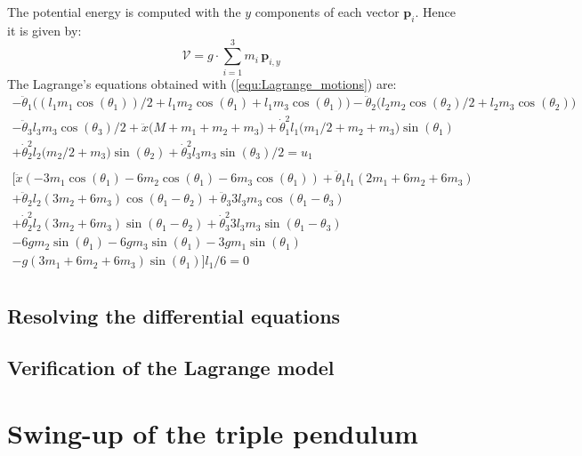 \documentclass[a4paper,12pt,twoside]{article}
\begin{document}
The potential energy is computed with the $y$ components of each vector $\mathbf{p}_i$. Hence it is given by:
\begin{equation}
	\mathcal{V} = g \cdot \sum_{i=1}^3 m_i\, \mathbf{p}_{i,y}
\end{equation}
The Lagrange's equations obtained with (\ref{equ:Lagrange_motions}) are:
\begin{multline}
- \ddot\theta_1 \big((l_1 m_1 \cos( \theta_1))/2 + l_1 m_2 \cos(\theta_1) + l_1 m_3 \cos(\theta_1)\big) - \ddot \theta_2 \big(l_2 m_2 \cos(\theta_2)/2 + l_2 m_3 \cos(\theta_2)\big) \\
- \ddot\theta_3 l_3 m_3 \cos(\theta_3)/2 + \ddot x \big(M + m_1 + m_2 + m_3\big) + \dot\theta_1^2 l_1 \big( m_1/2 + m_2 + m_3 \big)\sin(\theta_1) \\
+ \dot \theta_2^2 l_2\big(m_2/2 + m_3\big)\sin(\theta_2) +\dot \theta_3^2 l_3 m_3 \sin(\theta_3)/2 = u_1 \\
\end{multline}
\begin{multline}
\big[\ddot x\left( -3m_1\cos(\theta_1) - 6m_2\cos(\theta_1) - 6m_3\cos(\theta_1) \right) +\ddot\theta_1 l_1\left( 2m_1 + 6m_2 + 6m_3 \right) \\
+ \ddot\theta_2 l_2 \left(3m_2 + 6m_3\right) \cos(\theta_1 - \theta_2) + \ddot\theta_3 3l_3m_3\cos(\theta_1 - \theta_3) \\
+\dot\theta_2^2 l_2 (3m_2 + 6m_3) \sin(\theta_1-\theta_2) + \dot\theta_3^2 3 l_3m_3 \sin(\theta_1-\theta_3)\\
- 6 g m_2 \sin(\theta_1) - 6 g m_3 \sin(\theta_1) - 3 g m_1 \sin(\theta_1)\\
- g (3m_1+6m_2+6m_3) \sin(\theta_1) \big] l_1/6 = 0\\
\end{multline}

\subsection{Resolving the differential equations}

\subsection{Verification of the Lagrange model}


\section{Swing-up of the triple pendulum}
\end{document}
